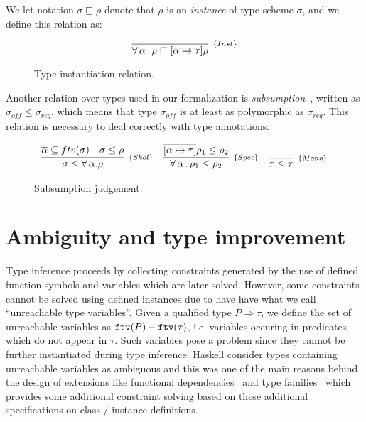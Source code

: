 \documentclass[a4paper, 11pt]{article}
\begin{document}
We let notation $\sigma \sqsubseteq \rho$ 
denote that $\rho$ is an \emph{instance} of type scheme $\sigma$, and 
we define this relation as:
\begin{figure}[H] 
\[
  \infer[_{\{Inst\}}] 
        {\forall\,\overline{\alpha}\,.\,\rho\sqsubseteq [\overline{\alpha\mapsto\tau}]\rho} 
        {}
\]
  \centering 
  \caption{Type instantiation relation.}
  \label{fig:instantiation}
\end{figure} 
Another relation over types used in our formalization is 
\emph{subsumption}~\cite{PeytonJones2007}, written as $\sigma_{off} \leq \sigma_{req}$, 
which means that type $\sigma_{off}$ is at least as polymorphic 
as $\sigma_{req}$. This relation is necessary to deal 
correctly with type annotations.

\begin{figure}[H]
\[
  \begin{array}{ccc} 
    \infer[_{\{Skol\}}] 
          {\sigma \leq \forall\,\overline{\alpha}.\rho}
          {\overline{\alpha}\subseteq ftv(\sigma) & 
            \sigma \leq \rho}
    & 
    \infer[_{\{Spec\}}]
          {\forall\,\overline{\alpha}\,.\,\rho_1 \leq \rho_2} 
          {\overline{[\alpha\mapsto\tau]}\rho_1 \leq \rho_2}
    & 
    \infer[_{\{Mono\}}] 
          {\tau \leq \tau}
          {}
  \end{array}
\]
  \centering 
  \caption{Subsumption judgement.}
  \label{fig:subsumption}
\end{figure}

\section{Ambiguity and type improvement}

Type inference proceeds by collecting constraints generated 
by the use of defined function symbols and variables which 
are later solved. However, some constraints cannot be solved 
using defined instances due to have have what we call 
``unreachable type variables''. Given a qualified type 
$P \Rightarrow \tau$, we define the set of unreachable variables 
as $\mathtt{ftv}(P) - \mathtt{ftv}(\tau)$, i.e. variables occuring in predicates 
which do not appear in $\tau$. Such variables pose a problem 
since they cannot be further instantiated during type inference.
Haskell consider types containing unreachable variables as 
ambiguous and this was one of the main reasons behind the 
design of extensions like functional dependencies~\cite{Jones2000}
and type families~\cite{Chakravarty2005} which provides some additional 
constraint solving based on these additional specifications on 
class / instance definitions.
\end{document}
